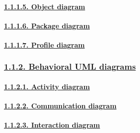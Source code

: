 \documentclass[
]{article}
\begin{document}
\hypertarget{object-diagram}{%
\paragraph{\texorpdfstring{\protect\hyperlink{object-diagram-1}{1.1.1.5.
Object diagram}}{1.1.1.5. Object diagram}}\label{object-diagram}}

\hypertarget{package-diagram}{%
\paragraph{\texorpdfstring{\protect\hyperlink{package-diagram-1}{1.1.1.6.
Package diagram}}{1.1.1.6. Package diagram}}\label{package-diagram}}

\hypertarget{profile-diagram}{%
\paragraph{\texorpdfstring{\protect\hyperlink{profile-diagram-1}{1.1.1.7.
Profile diagram}}{1.1.1.7. Profile diagram}}\label{profile-diagram}}

\hypertarget{behavioral-uml-diagrams}{%
\subsubsection{\texorpdfstring{\protect\hyperlink{behavioral-uml-diagrams-1}{1.1.2.
Behavioral UML
diagrams}}{1.1.2. Behavioral UML diagrams}}\label{behavioral-uml-diagrams}}

\hypertarget{activity-diagram}{%
\paragraph{\texorpdfstring{\protect\hyperlink{activity-diagram-1}{1.1.2.1.
Activity diagram}}{1.1.2.1. Activity diagram}}\label{activity-diagram}}

\hypertarget{communication-diagram}{%
\paragraph{\texorpdfstring{\protect\hyperlink{communication-diagram-1}{1.1.2.2.
Communication
diagram}}{1.1.2.2. Communication diagram}}\label{communication-diagram}}

\hypertarget{interaction-diagram}{%
\paragraph{\texorpdfstring{\protect\hyperlink{interaction-diagram-1}{1.1.2.3.
Interaction
diagram}}{1.1.2.3. Interaction diagram}}\label{interaction-diagram}}
\end{document}
